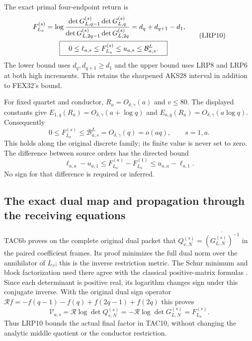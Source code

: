\documentclass[11pt,a4paper]{article}
\begin{document}
The exact primal four-endpoint return is
\[
\begin{split}
 F_{L_a}^{(s)}
 &=\log\frac{\det G_{L,q-1}^{(s)}\det G_{L,q}^{(s)}}
                  {\det G_{L,2q-1}^{(s)}\det G_{L,2q}^{(s)}}
   =d_q+d_{q+1}-d_1,\\
 &\hspace{7mm}\boxed{\quad
 0\le\ell_{a,s}\le F_{L_a}^{(s)}\le u_{a,s}
       \le\mathcal B^L_{a,s}.\quad}
\end{split}\tag{LRP10}
\]
The lower bound uses $d_q,d_{q+1}\ge d_1$ and the upper bound uses
LRP8 and LRP6 at both high increments. This retains the sharpened
AKS28 interval in addition to FEX32's bound.

For fixed quartet and conductor, $R_a=O_{\delta,\gamma}(a)$ and
$v\le80$. The displayed constants give
$E_{1,q}(R_a)=O_{\delta,\gamma}(a+\log q)$ and
$E_{a,q}(R_a)=O_{\delta,\gamma}(a\log q)$. Consequently
\[
 0\le F_{L_a}^{(s)}\le\mathcal B^L_{a,s}
       =O_{\delta,\gamma}(q)=o(aq),\qquad s=1,a.
 \tag{LRP11}
\]
This holds along the original discrete family; its finite value is
never set to zero. The difference between source orders has the
directed bound
\[
 \ell_{a,a}-u_{a,1}
 \le F_{L_a}^{(a)}-F_{L_a}^{(1)}
 \le u_{a,a}-\ell_{a,1}.
 \tag{LRP12}
\]
No sign for that difference is required or inferred.

\subsection{The exact dual map and propagation through the receiving equations}

TAC6b proves on the complete original dual packet that
$Q_{v,N}^{(s)}=\overline{(G_{L,N}^{(s)})^{-1}}$ in the paired
coefficient frames. Its proof minimizes the full dual norm over the
annihilator of $L_v$; this is the inverse restriction metric.
The Schur minimum and block factorization used there agree with
the classical positive-matrix formulas
\cite[Appendices A.5.5, p.~650, and C.4.1, p.~673]{human:boyd-vandenberghe}.
Since each determinant is positive real, its logarithm changes sign
under this conjugate inverse. With the original dual sign operator
$\mathcal R f=-f(q-1)-f(q)+f(2q-1)+f(2q)$ this proves
\[
 \mathcal V_{a,s}=\mathcal R\log\det Q_{v,N}^{(s)}
       =-\mathcal R\log\det G_{L,N}^{(s)}=F_{L_a}^{(s)}.
 \tag{LRP13}
\]
Thus LRP10 bounds the actual final factor in TAC10, without changing
the analytic middle quotient or the conductor restriction.
\end{document}
